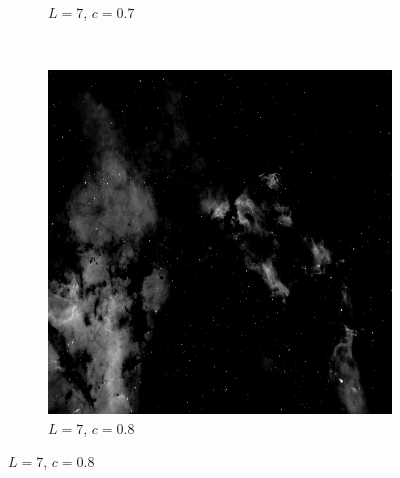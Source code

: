 \documentclass{article}
\begin{document}
\begin{enumerate}[label=(\alph*)]
\begin{figure}[!htb]
\begin{subfigure}[b]{0.3\textwidth}
            \caption{$L = 7$, $c = 0.7$}
        \end{subfigure}
        ~
        \begin{subfigure}[b]{0.3\textwidth}
            \includegraphics[width=\textwidth]{img/C_7_08.png}
            \caption{$L = 7$, $c = 0.8$}
        \end{subfigure}



\end{figure}
\end{enumerate}
\end{document}
